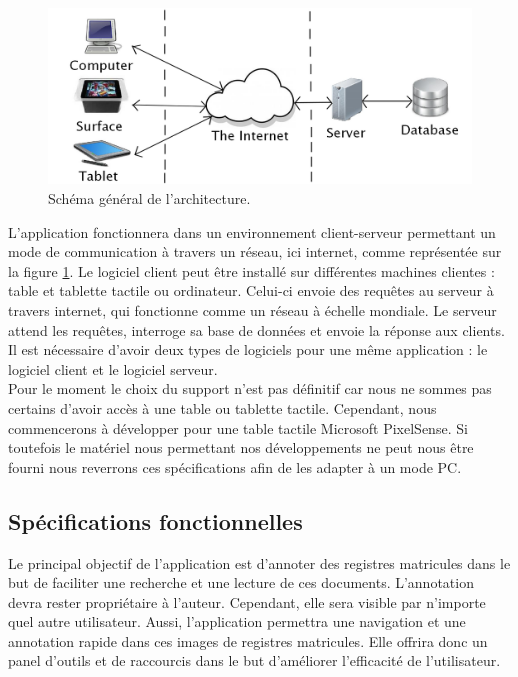\documentclass[a4paper]{article}
\begin{document}
\begin{figure}[H]
\centering
\includegraphics[width=\textwidth]{Specifications_schema_architecture_client_serveur.png}
\caption{\label{fig:architecture}Sch\'ema g\'en\'eral de l'architecture.}
\end{figure}

	L'application fonctionnera dans un environnement client-serveur permettant un mode de communication \`a travers un r\'eseau, ici internet, comme repr\'esent\'ee sur la figure \ref{fig:architecture}. Le logiciel client peut \^etre install\'e sur diff\'erentes machines clientes : table et tablette tactile ou ordinateur. Celui-ci envoie des requ\^etes au serveur \`a travers internet, qui fonctionne comme un r\'eseau \`a \'echelle mondiale. Le serveur attend les requ\^etes, interroge sa base de donn\'ees et envoie la r\'eponse aux clients. Il est n\'ecessaire d'avoir deux types de logiciels pour une m\^eme application : le logiciel client et le logiciel serveur.\\
    
     Pour le moment le choix du support n'est pas d\'efinitif car nous ne sommes pas certains d'avoir acc\`es \`a une table ou tablette tactile. Cependant, nous commencerons \`a d\'evelopper pour une table tactile Microsoft PixelSense. Si toutefois le mat\'eriel nous permettant nos d\'eveloppements ne peut nous \^etre fourni nous reverrons ces sp\'ecifications afin de les adapter \`a un mode PC.
    
\subsection{Sp\'ecifications fonctionnelles}
\label{subsec:fonctionnelles}

	Le principal objectif de l'application est d'annoter des registres matricules dans le but de faciliter une recherche et une lecture de ces documents. L'annotation devra rester propri\'etaire \`a l'auteur. Cependant, elle sera visible par n'importe quel autre utilisateur. Aussi, l'application permettra une navigation et une annotation rapide dans ces images de registres matricules. Elle offrira donc un panel d'outils et de raccourcis dans le but d'am\'eliorer l'efficacit\'e de l'utilisateur.\\
    
\end{document}

